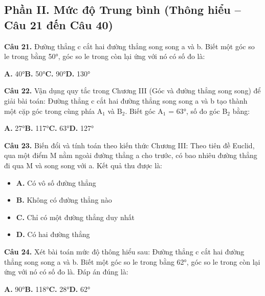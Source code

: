 \documentclass[11pt,a4paper]{article}
\begin{document}
\subsection*{\color{accent} Phần II. Mức độ Trung bình (Thông hiểu -- Câu 21 đến Câu 40)}
\textbf{\color{primary} Câu 21.} Đường thẳng c cắt hai đường thẳng song song a và b. Biết một góc so le trong bằng 50°, góc so le trong còn lại ứng với nó có số đo là:\par
\hspace*{1.5em}\textbf{A.} 40°\quad\quad \textbf{B.} 50°\quad\quad \textbf{C.} 90°\quad\quad \textbf{D.} 130°\par\vspace{2pt}
\textbf{\color{primary} Câu 22.} Vận dụng quy tắc trong Chương III (Góc và đường thẳng song song) để giải bài toán: Đường thẳng c cắt hai đường thẳng song song a và b tạo thành một cặp góc trong cùng phía A$_1$ và B$_2$. Biết góc A$_1$ = 63°, số đo góc B$_2$ bằng:\par
\hspace*{1.5em}\textbf{A.} 27°\quad\quad \textbf{B.} 117°\quad\quad \textbf{C.} 63°\quad\quad \textbf{D.} 127°\par\vspace{2pt}
\textbf{\color{primary} Câu 23.} Biến đổi và tính toán theo kiến thức Chương III: Theo tiên đề Euclid, qua một điểm M nằm ngoài đường thẳng a cho trước, có bao nhiêu đường thẳng đi qua M và song song với a. Kết quả thu được là:\par
\begin{itemize}\setlength{\itemsep}{1pt}\setlength{\parskip}{0pt}
  \item[] \textbf{A.} Có vô số đường thẳng
  \item[] \textbf{B.} Không có đường thẳng nào
  \item[] \textbf{C.} Chỉ có một đường thẳng duy nhất
  \item[] \textbf{D.} Có hai đường thẳng
\end{itemize}\vspace{2pt}
\textbf{\color{primary} Câu 24.} Xét bài toán mức độ thông hiểu sau: Đường thẳng c cắt hai đường thẳng song song a và b. Biết một góc so le trong bằng 62°, góc so le trong còn lại ứng với nó có số đo là. Đáp án đúng là:\par
\hspace*{1.5em}\textbf{A.} 90°\quad\quad \textbf{B.} 118°\quad\quad \textbf{C.} 28°\quad\quad \textbf{D.} 62°\par\vspace{2pt}
\end{document}
